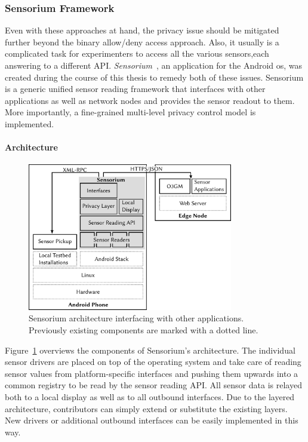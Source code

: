 \subsubsection{Sensorium Framework}

Even with these approaches at hand, the privacy issue should be mitigated further beyond the binary allow/deny access approach. Also, it usually is a complicated task for experimenters to access all the various sensors,each answering to a different \gls{API}. \textit{Sensorium}~\cite{raf2013sensorium}, an application for the Android \gls{os}, was created during the course of this thesis to remedy both of these issues. Sensorium is a generic unified sensor reading framework that interfaces with other applications as well as network nodes and provides the sensor readout to them. More importantly, a fine-grained multi-level privacy control model is implemented.


\paragraph{Architecture}

\begin{figure}[htb]
	\centering
	\includegraphics[width=0.8\textwidth]{images/sensorium-arch.pdf}
	\caption{Sensorium architecture interfacing with other applications. Previously existing components are marked with a dotted line.}
\label{c5:fig:architecture}
\end{figure}

Figure~\ref{c5:fig:architecture} overviews the components of Sensorium's architecture. The individual sensor drivers are placed on top of the operating system and take care of reading sensor values from platform-specific interfaces and pushing them upwards into a common registry to be read by the sensor reading \acrshort{API}. All sensor data is relayed both to a local display as well as to all outbound interfaces. Due to the layered architecture, contributors can simply extend or substitute the existing layers. New drivers or additional outbound interfaces can be easily implemented in this way. 

